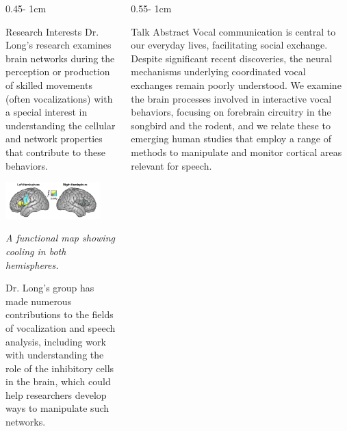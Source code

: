 \documentclass{../psuposter}
\begin{document}
\begin{frame}
\begin{columns}[t, totalwidth=\textwidth]
\begin{column}{0.45\textwidth - 1cm}
    \begin{block}{Research Interests}
        Dr. Long's research examines brain networks during the perception or production of skilled movements (often vocalizations) with a special interest in understanding the cellular and network properties that contribute to these behaviors.
        \begin{center}
	    	\includegraphics[width=0.85\textwidth]{images/neuro}    		
    	\end{center}
    	\textit{A functional map showing cooling in both hemispheres.} \cite{longResearchLongLab}
    	
    	Dr. Long's group has made numerous contributions to the fields of vocalization and speech analysis, including work with understanding the role of the inhibitory cells in the brain, which could help researchers develop ways to manipulate such networks.
    \end{block}
\end{column}
\begin{column}{0.55\textwidth - 1cm}


    \begin{block}{Talk Abstract}
    	Vocal communication is central to our everyday lives, facilitating social exchange. Despite significant recent discoveries, the neural mechanisms underlying coordinated vocal exchanges remain poorly understood. We examine the brain processes involved in interactive vocal behaviors, focusing on forebrain circuitry in the songbird and the rodent, and we relate these to emerging human studies that employ a range of methods to manipulate and monitor cortical areas relevant for speech.
    \end{block}



\end{column}
\end{columns}
\end{frame}
\end{document}
